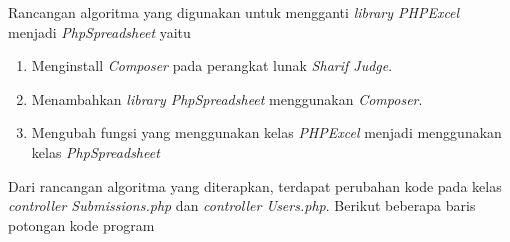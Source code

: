 Rancangan algoritma yang digunakan untuk mengganti \textit{library PHPExcel} menjadi \textit{PhpSpreadsheet} yaitu
\begin{enumerate}
	\item Menginstall \textit{Composer} pada perangkat lunak \textit{Sharif Judge}.
	\item Menambahkan \textit{library PhpSpreadsheet} menggunakan \textit{Composer}.
	\item Mengubah fungsi yang menggunakan kelas \textit{PHPExcel} menjadi menggunakan kelas \textit{PhpSpreadsheet}
\end{enumerate}

Dari rancangan algoritma yang diterapkan, terdapat perubahan kode pada kelas \textit{controller Submissions.php} dan \textit{controller Users.php}. Berikut beberapa baris potongan kode program

